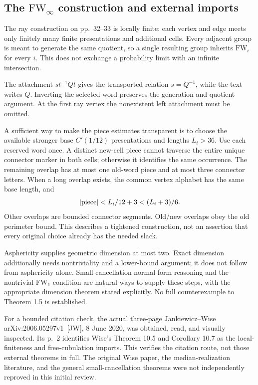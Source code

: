 \documentclass[10pt]{article}
\begin{document}
\subsection*{The \(\mathrm{FW}_\infty\) construction and external imports}
The ray construction on pp. 32–33 is locally finite: each vertex and edge meets only finitely many finite presentations and additional cells. Every adjacent group is meant to generate the same quotient, so a single resulting group inherits \(\mathrm{FW}_i\) for every \(i\). This does not exchange a probability limit with an infinite intersection.\par
The attachment \(s t^{-1}Qt\) gives the transported relation \(s=Q^{-1}\), while the text writes \(Q\). Inverting the selected word preserves the generation and quotient argument. At the first ray vertex the nonexistent left attachment must be omitted.\par
A sufficient way to make the piece estimates transparent is to choose the available stronger base \(C'(1/12)\) presentations and lengths \(L_i>36\). Use each reserved word once. A distinct new-cell piece cannot traverse the entire unique connector marker in both cells; otherwise it identifies the same occurrence. The remaining overlap has at most one old-word piece and at most three connector letters. When a long overlap exists, the common vertex alphabet has the same base length, and \[|{\rm piece}|<L_i/12+3<(L_i+3)/6.\] Other overlaps are bounded connector segments. Old/new overlaps obey the old perimeter bound. This describes a tightened construction, not an assertion that every original choice already has the needed slack.\par
Asphericity supplies geometric dimension at most two. Exact dimension additionally needs nontriviality and a lower-bound argument; it does not follow from asphericity alone. Small-cancellation normal-form reasoning and the nontrivial \(\mathrm{FW}_1\) condition are natural ways to supply these steps, with the appropriate dimension theorem stated explicitly. No full counterexample to Theorem 1.5 is established.\par
For a bounded citation check, the actual three-page Jankiewicz–Wise arXiv:2006.05297v1 [JW], 8 June 2020, was obtained, read, and visually inspected. Its p. 2 identifies Wise’s Theorem 10.5 and Corollary 10.7 as the local-finiteness and free-cubulation imports. This verifies the citation route, not those external theorems in full. The original Wise paper, the median-realization literature, and the general small-cancellation theorems were not independently reproved in this initial review.\par
\end{document}
